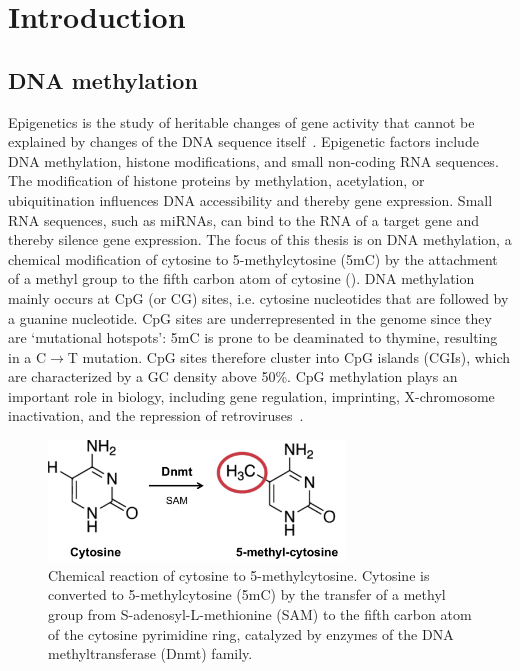 
\chapter{Introduction} \label{sec:intro}

\ifpdf
    \graphicspath{{Chapter1/Figs/Raster/}{Chapter1/Figs/PDF/}{Chapter1/Figs/}}
\else
    \graphicspath{{Chapter1/Figs/Vector/}{Chapter1/Figs/}}
\fi

\section{DNA methylation} \label{sec:intro_met}

Epigenetics is the study of heritable changes of gene activity that cannot be explained by changes of the DNA sequence itself~\citep{holliday_dna_1996}. Epigenetic factors include DNA methylation, histone modifications, and small non-coding RNA sequences. The modification of histone proteins by methylation, acetylation, or ubiquitination influences DNA accessibility and thereby gene expression. Small RNA sequences, such as miRNAs, can bind to the RNA of a target gene and thereby silence gene expression. The focus of this thesis is on DNA methylation, a chemical modification of cytosine to 5-methylcytosine (5mC) by the attachment of a methyl group to the fifth carbon atom of cytosine ().  DNA methylation mainly occurs at CpG (or CG) sites, i.e. cytosine nucleotides that are followed by a guanine nucleotide. CpG sites are underrepresented in the genome since they are `mutational hotspots': 5mC is prone to be deaminated to thymine, resulting in a C$\rightarrow$T mutation. CpG sites therefore cluster into CpG islands (CGIs), which are characterized by a GC density above 50\%. CpG methylation plays an important role in biology, including gene regulation, imprinting, X-chromosome inactivation, and the repression of retroviruses~\citep{holliday_dna_1996,robertson_dna_2005,jones_functions_2012,moore_dna_2013}.

\begin{figure}[htbp!]
\centering
\includegraphics[width=0.7\textwidth]{cpg}
\caption[Chemical reaction of cytosine to 5-methylcytosine.]{Chemical reaction of cytosine to 5-methylcytosine. Cytosine is converted to 5-methylcytosine (5mC) by the transfer of a methyl group from S-adenosyl-L-methionine (SAM) to the fifth carbon atom of the cytosine pyrimidine ring, catalyzed by enzymes of the DNA methyltransferase (Dnmt) family.}
\label{fig:intro_cpg}
\end{figure}


